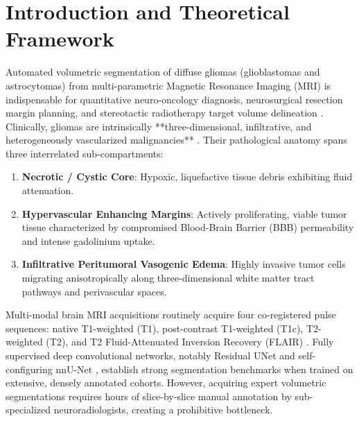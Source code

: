 \documentclass{article}
\begin{document}
\begin{abstract}
\end{abstract}

\section{Introduction and Theoretical Framework}

Automated volumetric segmentation of diffuse gliomas (glioblastomas and astrocytomas) from multi-parametric Magnetic Resonance Imaging (MRI) is indispensable for quantitative neuro-oncology diagnosis, neurosurgical resection margin planning, and stereotactic radiotherapy target volume delineation \citep{brats2024,menze2014multimodal}. Clinically, gliomas are intrinsically **three-dimensional, infiltrative, and heterogeneously vascularized malignancies** \citep{menze2014multimodal}. Their pathological anatomy spans three interrelated sub-compartments:
\begin{enumerate}
    \item \textbf{Necrotic / Cystic Core}: Hypoxic, liquefactive tissue debris exhibiting fluid attenuation.
    \item \textbf{Hypervascular Enhancing Margins}: Actively proliferating, viable tumor tissue characterized by compromised Blood-Brain Barrier (BBB) permeability and intense gadolinium uptake.
    \item \textbf{Infiltrative Peritumoral Vasogenic Edema}: Highly invasive tumor cells migrating anisotropically along three-dimensional white matter tract pathways and perivascular spaces.
\end{enumerate}

Multi-modal brain MRI acquisitions routinely acquire four co-registered pulse sequences: native T1-weighted (T1), post-contrast T1-weighted (T1c), T2-weighted (T2), and T2 Fluid-Attenuated Inversion Recovery (FLAIR) \citep{brats2024}. Fully supervised deep convolutional networks, notably Residual UNet \citep{ronneberger2015u,milletari2016vnet} and self-configuring nnU-Net \citep{isensee2021nnunet}, establish strong segmentation benchmarks when trained on extensive, densely annotated cohorts. However, acquiring expert volumetric segmentations requires hours of slice-by-slice manual annotation by sub-specialized neuroradiologists, creating a prohibitive bottleneck.
\end{document}
